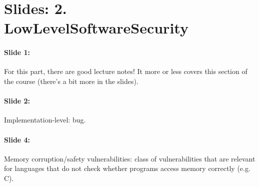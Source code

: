 \documentclass[10pt,a4paper]{report}
\begin{document}
\section{Slides: 2. LowLevelSoftwareSecurity}

\paragraph{Slide 1:} For this part, there are good lecture notes! It more or less covers this section of the course (there's a bit more in the slides).

\paragraph{Slide 2:} Implementation-level: bug.

\paragraph{Slide 4:} Memory corruption/safety vulnerabilities: class of vulnerabilities that are relevant for languages that do not check whether programs access memory correctly (e.g. C). 
\end{document}

